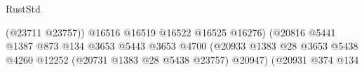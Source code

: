 \begin{lexlean}{RustStd}
\begin{coremodule}
                                                                                (@23711 @23757))
                                                                              @16516
                                                                              @16519
                                                                              @16522
                                                                              @16525
                                                                              @16276)
                                                                            (@20816
                                                                              @5441
                                                                              @1387
                                                                              @873
                                                                              @134
                                                                              @3653
                                                                              @5443
                                                                              @3653
                                                                              @4700
                                                                              (@20933
                                                                                @1383
                                                                                @28
                                                                                @3653
                                                                                @5438
                                                                                @4260
                                                                                @12252
                                                                                (@20731
                                                                                  @1383
                                                                                  @28
                                                                                  @5438
                                                                                  @23757)
                                                                                @20947)
                                                                              (@20931
                                                                                @374
                                                                                @134

\end{coremodule}
\end{lexlean}
